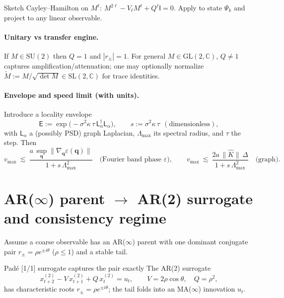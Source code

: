 \documentclass[11pt]{article}
\newcommand{\Id}{\mathsf{I}}
\newcommand{\Lap}{\mathsf{L}_\alpha}
\newcommand{\Q}{Q}
\newcommand{\E}{\mathsf{E}}
\begin{document}
\begin{proofbox}{Sketch}
Cayley--Hamilton on $M^\ell$: $M^{2\ell}-V_\ell M^\ell + Q^\ell \Id=0$.
Apply to state $\Psi_k$ and project to any linear observable.
\end{proofbox}

\paragraph{Unitary vs transfer engine.}
If $M\in\mathrm{SU}(2)$ then $\Q=1$ and $|r_\pm|=1$. For general $M\in\mathrm{GL}(2,\mathbb{C})$, $\Q\neq1$ captures amplification/attenuation; one may optionally normalize $\widetilde M:=M/\sqrt{\det M}\in\mathrm{SL}(2,\mathbb{C})$ for trace identities.

\paragraph{Envelope and speed limit (with units).}
Introduce a locality envelope
\begin{equation}
\E := \exp\!\big(-\sigma^2\kappa\,\tau\,\Lap^\dagger\Lap\big),\qquad s:=\sigma^2\kappa\,\tau\ \ (\text{dimensionless}),
\end{equation}
with $\Lap$ a (possibly PSD) graph Laplacian, $\Lambda_{\max}$ its spectral radius, and $\tau$ the step.
Then
\begin{equation}
v_{\max}\ \lesssim\ \frac{a\,\sup_{\mathbf q}\|\nabla_{\mathbf q}\varepsilon(\mathbf q)\|}{1+s\,\Lambda_{\max}^2}
\quad\text{(Fourier band phase $\varepsilon$)},\qquad
v_{\max}\ \lesssim\ \frac{2 a\,\|\widehat K\|\,\Delta}{1+s\,\Lambda_{\max}^2}\quad\text{(graph)}.
\label{eq:speed}
\end{equation}

\section{AR($\infty$) parent $\to$ AR(2) surrogate and consistency regime}
Assume a coarse observable has an AR($\infty$) parent with one dominant conjugate pair $r_\pm=\rho e^{\pm i\theta}$ ($\rho\le1$) and a stable tail.

\begin{myprop}{Padé [1/1] surrogate captures the pair exactly}
The AR(2) surrogate
\begin{equation}
x^{(2)}_{t+2}-V\,x^{(2)}_{t+1}+Q\,x^{(2)}_{t}=u_t,\qquad V=2\rho\cos\theta,\quad Q=\rho^2,
\label{eq:ar2-surrogate}
\end{equation}
has characteristic roots $r_\pm=\rho e^{\pm i\theta}$; the tail folds into an MA($\infty$) innovation $u_t$.
\end{myprop}
\end{document}
